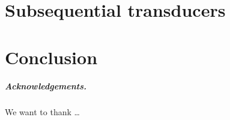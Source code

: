 \documentclass[a4paper,USenglish]{lipics-v2016}
\begin{document}
\section{Subsequential transducers}



\section{Conclusion}\label{sec:conclusion}

\subparagraph*{Acknowledgements.}

We want to thank \dots




\end{document}

